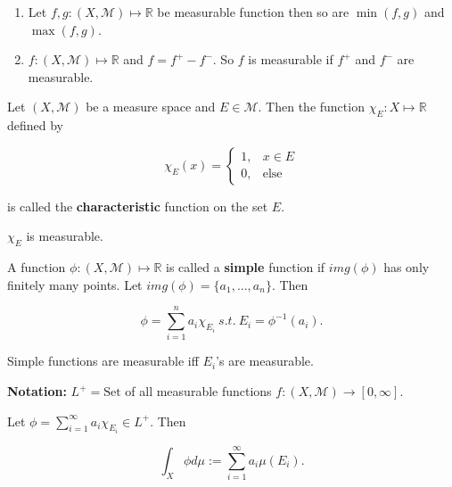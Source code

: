 \documentclass{functionspaces}
\begin{document}
\begin{corollary}
\begin{enumerate}
    \item Let $f,g:(X,\mathcal{M}) \mapsto \mathbb{R}$ be measurable function then so are $\min(f,g)$ and $\max(f,g)$.
    
    \item $f:(X,\mathcal{M}) \mapsto \mathbb{R}$ and $f = f^{+} - f^{-}$. So $f$ is measurable if $f^{+}$ and $f^{-}$ are measurable.
\end{enumerate}
\end{corollary}

\begin{definition}
Let $(X,\mathcal{M})$ be a measure space and $E \in \mathcal{M}$. Then the function $\chi_{E}:X \mapsto \mathbb{R}$ defined by

\[
\chi_{E}(x) = \begin{cases}
1, & x \in E \\
0, & \text{else}
\end{cases}
\]

is called the \textbf{characteristic} function on the set $E$.
\end{definition}

\begin{remark}
$\chi_{E}$ is measurable.
\end{remark}

\begin{definition}
A function $\phi:(X,\mathcal{M}) \mapsto \mathbb{R}$ is called a \textbf{simple} function if $img(\phi)$ has only finitely many points. Let $img(\phi) = \{a_{1},\ldots,a_{n}\}$. Then

\[
\phi = \sum_{i=1}^{n} a_{i} \chi_{E_{i}}\ s.t.\ E_{i} = \phi^{-1}(a_{i}).
\]
\end{definition}

\begin{remark}
Simple functions are measurable iff $E_{i}$'s are measurable.
\end{remark}

\textbf{Notation:} $L^{+} = \text{Set}$ of all measurable functions $f:(X,\mathcal{M}) \rightarrow [0,\infty]$.

Let $\phi = \sum_{i=1}^{\infty} a_{i} \chi_{E_{i}} \in L^{+}$. Then

\[
\int_{X} \phi d\mu := \sum_{i=1}^{\infty} a_{i} \mu(E_{i}).
\]
\end{document}
